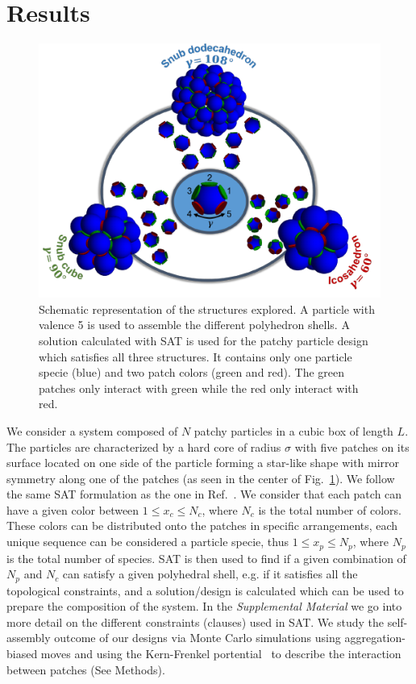 \documentclass[a4paper, amsfonts, amssymb, amsmath, reprint, showkeys, nofootinbib, oneside]{revtex4-1}
\begin{document}
\section{Results}


\begin{figure}[t]
	\includegraphics{fig1.pdf}
	\caption{\label{SAT} Schematic representation of the structures explored. A particle with valence 5 is used to assemble the different polyhedron shells. A solution calculated with SAT is used for the patchy particle design which satisfies all three structures. It contains only one particle specie (blue) and two patch colors (green and red). The green patches only interact with green while the red only interact with red.}
\end{figure}

We consider a system composed of $N$ patchy particles in a cubic box of length $L$. The particles are characterized by a hard core of radius $\sigma$ with five patches on its surface located on one side of the particle forming a star-like shape with mirror symmetry along one of the patches (as seen in the center of Fig.~\ref{SAT}).
We follow the same SAT formulation as the one in Ref.~\cite{Russo2022}. We consider that each patch can have a given color between $1\leq x_c\leq N_c$, where $N_c$ is the total number of colors. These colors can be distributed onto the patches in specific arrangements, each unique sequence can be considered a particle specie, thus $1\leq x_p\leq N_p$, where $N_p$ is the total number of species. SAT is then used to find if a given combination of $N_p$ and $N_c$ can satisfy a given polyhedral shell, e.g. if it satisfies all the topological constraints, and a solution/design is calculated which can be used to prepare the composition of the system. In the \emph{Supplemental Material} we go into more detail on the different constraints (clauses) used in SAT.
We study the self-assembly outcome of our designs via Monte Carlo simulations using aggregation-biased moves and using the Kern-Frenkel portential~\cite{Kern2003} to describe the interaction between patches (See Methods).
\end{document}
